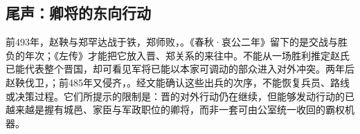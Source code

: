 \subsection{尾声：卿将的东向行动}

前493年，赵鞅与郑罕达战于铁，郑师败，。《春秋·哀公二年》留下的是交战与胜负的年次；《左传》才能把它放入晋、郑关系的来往中。不能从一场胜利推定赵氏已能代表整个晋国，却可看见军将已能以本家可调动的部众进入对外冲突。两年后赵鞅伐卫，；前485年又侵齐，。经文能确认这些出兵的次序，不能恢复兵员、路线或决策过程。它们所提示的限制是：晋的对外行动仍在继续，但能够发动行动的已越来越是握有城邑、家臣与军政职位的卿将，而非一套可由公室统一收回的霸权机器。
